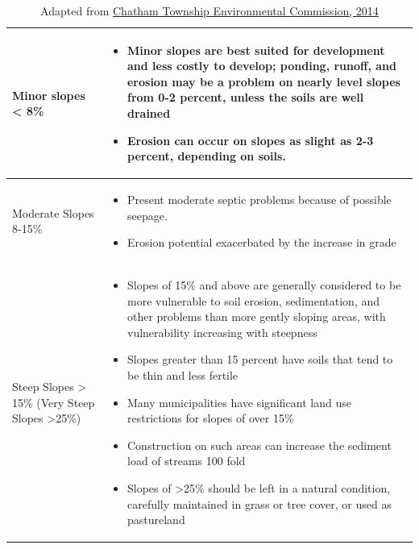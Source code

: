 \begin{table}
\begin{center}
\begin{tabular}{ | p{} p{}| } 
\hline
Minor slopes < 8\% &
    \begin{itemize}
    \item Minor slopes are best suited for development and less costly to 
    develop; ponding, runoff, and erosion may be a problem on nearly level 
    slopes from 0-2 percent, unless the soils are well drained
    \item Erosion can occur on slopes as slight as 2-3 percent, depending on
    soils.
    \end{itemize}
    \\
\hline
Moderate Slopes 8-15\% &
    \begin{itemize}
        \item Present moderate septic problems because of possible seepage.
        \item Erosion potential exacerbated by the increase in grade
    \end{itemize}
    \\
\hline
Steep Slopes > 15\% (Very Steep Slopes >25\%) &
    \begin{itemize}
    \item Slopes of 15\% and above are generally considered to be more 
    vulnerable to soil erosion, sedimentation, and other problems than more 
    gently sloping areas, with vulnerability increasing with steepness
    \item Slopes greater than 15 percent have soils that tend to be thin and 
    less fertile
    \item Many municipalities have significant land use restrictions for slopes 
    of over 15\%
    \item Construction on such areas can increase the sediment load of streams 
    100 fold
    \item Slopes of  >25\% should be left in a natural condition, carefully 
    maintained in grass or tree cover, or used as pastureland
    \end{itemize}
    \\
\hline
\end{tabular}
\end{center}
\caption{Adapted from \href{http://www.chathamtownship-nj.gov/images/CTEC/NRI1999/slopesadd090704.pdf}{Chatham Township Environmental Commission, 2014}\label{tab:steepslopes}}
\end{table}
